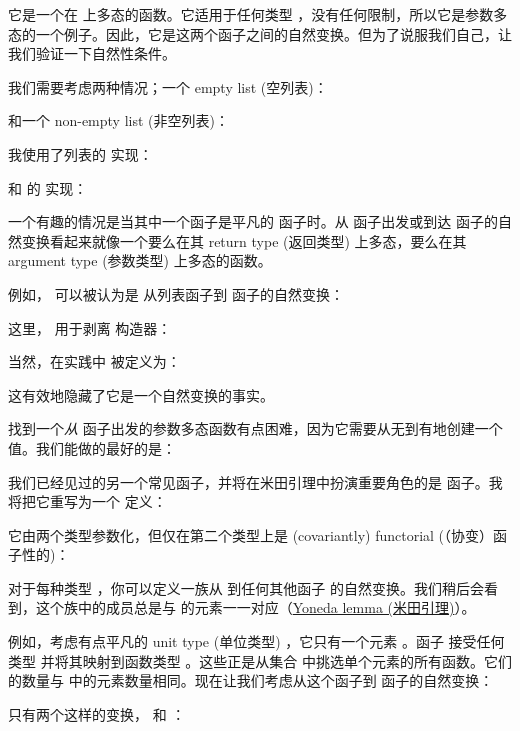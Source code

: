 它是一个在  上多态的函数。它适用于任何类型 ，没有任何限制，所以它是参数多态的一个例子。因此，它是这两个函子之间的自然变换。但为了说服我们自己，让我们验证一下自然性条件。

我们需要考虑两种情况；一个 empty list (空列表)：


和一个 non-empty list (非空列表)：


我使用了列表的  实现：

和  的  实现：

一个有趣的情况是当其中一个函子是平凡的  函子时。从  函子出发或到达  函子的自然变换看起来就像一个要么在其 return type (返回类型) 上多态，要么在其 argument type (参数类型) 上多态的函数。

例如， 可以被认为是 从列表函子到  函子的自然变换：

这里， 用于剥离  构造器：

当然，在实践中  被定义为：

这有效地隐藏了它是一个自然变换的事实。

找到一个\emph{从}  函子出发的参数多态函数有点困难，因为它需要从无到有地创建一个值。我们能做的最好的是：

我们已经见过的另一个常见函子，并将在米田引理中扮演重要角色的是  函子。我将把它重写为一个  定义：

它由两个类型参数化，但仅在第二个类型上是 (covariantly) functorial (（协变）函子性的)：

对于每种类型 ，你可以定义一族从  到任何其他函子  的自然变换。我们稍后会看到，这个族中的成员总是与  的元素一一对应（\hyperref[the-yoneda-lemma]{Yoneda lemma (米田引理)}）。

例如，考虑有点平凡的 unit type (单位类型) \code{()}，它只有一个元素 \code{()}。函子  接受任何类型  并将其映射到函数类型 。这些正是从集合  中挑选单个元素的所有函数。它们的数量与  中的元素数量相同。现在让我们考虑从这个函子到  函子的自然变换：

只有两个这样的变换， 和 ：

